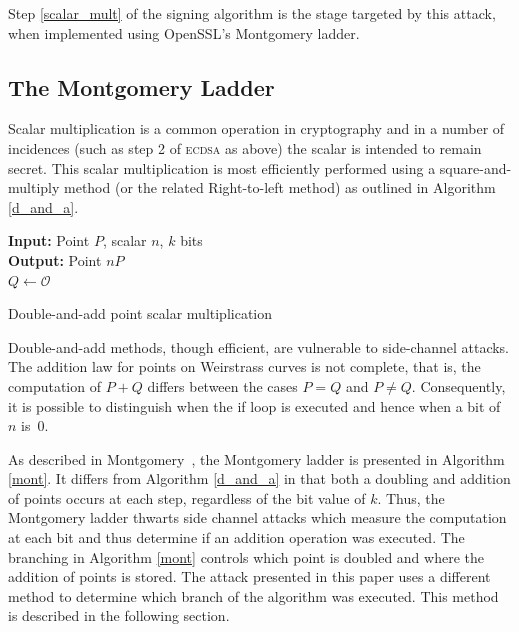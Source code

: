 \documentclass[twocolumn]{svjour3}
\begin{document}
Step \ref{scalar_mult} of the signing algorithm is the stage targeted by this attack, when implemented using OpenSSL's Montgomery ladder. %

\subsection{The Montgomery Ladder}\label{sub:montgomery}
Scalar multiplication is a common operation in cryptography and in a number of incidences (such as step 2 of \textsc{ecdsa} as above) the scalar is intended to remain secret. This scalar multiplication is most efficiently performed using a square-and-multiply method (or the related Right-to-left method) as outlined in Algorithm \ref{d_and_a}.\\

\vspace{-0.8cm}
\begin{algorithm}[htb]\label{d_and_a}
\SetAlgoLined
{\bf Input:} Point $P$, scalar $n$, $k$ bits\\
{\bf Output:} Point $nP$\\
$Q\gets \mathcal{O}$\\
 \caption{Double-and-add point scalar multiplication}
\end{algorithm}\vspace{-0.5cm}
Double-and-add methods, though efficient, are vulnerable to side-channel attacks. %
The addition law for points on Weirstrass curves is not complete, that is, the computation of $P+Q$ differs between the cases $P=Q$ and $P\neq Q.$ Consequently, 
it is possible to distinguish when the if loop is executed and hence when a bit of $n$ is~0.

As described in Montgomery~\cite{montgomery87speeding}, the Montgomery ladder is presented in Algorithm \ref{mont}. It differs from Algorithm \ref{d_and_a} in that both a doubling and addition of points occurs at each step, regardless of the bit value of $k$. Thus, the Montgomery ladder thwarts side channel attacks which measure the computation at each bit and thus determine if an addition operation was executed. The branching in Algorithm \ref{mont} controls which point is doubled and where the addition of points is stored. The attack presented in this paper uses a different method to determine which branch of the algorithm was executed.
This method is described in the following section.
\end{document}
